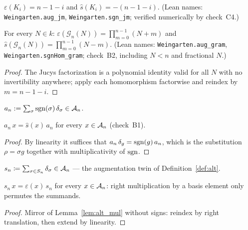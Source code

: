 \begin{lemma}[Values on $K_i$]\label{lem:aug}
\leanok
{}
$\varepsilon(K_i)=n-1-i$ and $\hat s(K_i)=-(n-1-i)$.
(Lean names: \texttt{Weingarten.aug\_jm}, \texttt{Weingarten.sgn\_jm};
verified numerically by check~C4.)
\end{lemma}

\begin{lemma}\label{lem:gram_eval}
\leanok
{}
For every $N\in k$:
$\varepsilon(\mathcal G_n(N))=\prod_{m=0}^{n-1}(N+m)$ and
$\hat s(\mathcal G_n(N))=\prod_{m=0}^{n-1}(N-m)$.
(Lean names: \texttt{Weingarten.aug\_gram}, \texttt{Weingarten.sgnHom\_gram};
check~B2, including $N<n$ and fractional $N$.)
\end{lemma}
\begin{proof}
\leanok
{}
The Jucys factorization is a polynomial identity valid for all $N$ with no
invertibility anywhere; apply each homomorphism factorwise and reindex by
$m=n-1-i$.
\end{proof}

\begin{definition}\label{def:alt}
\leanok
{}
$a_n:=\sum_{\sigma}\operatorname{sgn}(\sigma)\,\delta_\sigma\in\mathcal{A}_{n}$.
\end{definition}

\begin{lemma}[Absorption]\label{lem:alt_mul}
\leanok
{}
$a_n\,x=\hat s(x)\,a_n$ for every $x\in\mathcal{A}_{n}$ (check~B1).
\end{lemma}
\begin{proof}
\leanok
{}
By linearity it suffices that $a_n\,\delta_g=\operatorname{sgn}(g)\,a_n$, which is the
substitution $\rho=\sigma g$ together with multiplicativity of $\operatorname{sgn}$.
\end{proof}

\begin{definition}\label{def:ones}
\leanok
{}
$s_n \coloneqq \sum_{\sigma\in S_n}\delta_\sigma\in\mathcal{A}_{n}$ --- the
augmentation twin of Definition~\ref{def:alt}.
\end{definition}

\begin{lemma}\label{lem:ones_mul}
\leanok
{}
$s_n\,x = \varepsilon(x)\,s_n$ for every $x\in\mathcal{A}_{n}$: right
multiplication by a basis element only permutes the summands.
\end{lemma}
\begin{proof}
\leanok
{}
Mirror of Lemma~\ref{lem:alt_mul} without signs: reindex by right
translation, then extend by linearity.
\end{proof}

